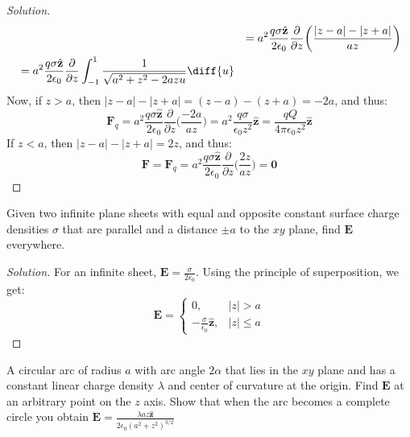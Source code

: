 \documentclass[crop=false,class=article,oneside]{standalone}
\begin{document}
\begin{proof}[Solution]
\begin{align*}
            &
            &=a^{2}\frac{q\sigma\hat{\mathbf{z}}}{2\epsilon_{0}}
            \frac{\partial}{\partial{z}}
            \bigg(\frac{|z-a|-|z+a|}{az}\bigg)\\
            &=a^{2}\frac{q\sigma \hat{\mathbf{z}}}{2\epsilon_{0}}
            \frac{\partial}{\partial{z}}
            \int_{-1}^{1}\frac{1}{\sqrt{a^{2}+z^{2}-2azu}}\diff{u}\\
        \end{align*}
        Now, if $z>a$, then $|z-a|-|z+a|=(z-a)-(z+a)=-2a$, and thus:
        \begin{equation*}
            \mathbf{F}_{q}
            =a^{2}\frac{q\sigma\hat{\mathbf{z}}}{2\epsilon_{0}}
            \frac{\partial}{\partial{z}}\bigg(\frac{-2a}{az}\bigg)
            =a^{2}\frac{q\sigma}{\epsilon_{0}z^{2}}\hat{\mathbf{z}}
            =\frac{qQ}{4\pi\epsilon_{0}z^{2}}\hat{\mathbf{z}}\tag{$z>a$}
        \end{equation*}
        If $z<a$, then $|z-a|-|z+a|=2z$, and thus:
        \begin{equation*}
            \mathbf{F}=\mathbf{F}_{q}=a^{2}\frac{q\sigma
            \hat{\mathbf{z}}}{2\epsilon_{0}}
            \frac{\partial}{\partial z}\bigg(\frac{2z}{az}\bigg)
            =\mathbf{0}\tag{$z<a$}
        \end{equation*}
    \end{proof}
    \begin{problem}[Wangsness 3-9]
        Given two infinite plane sheets with equal and opposite
        constant surface charge densities $\sigma$ that are
        parallel and a distance $\pm a$ to the $xy$ plane,
        find $\mathbf{E}$ everywhere.
    \end{problem}
    \begin{proof}[Solution]
        For an infinite sheet,
        $\mathbf{E}=\frac{\sigma}{2\epsilon_{0}}$.
        Using the principle of superposition, we get:
        \begin{equation*}
            \mathbf{E}=
            \begin{cases}
                0,
                &|z|>a\\
                -\frac{\sigma}
                      {\epsilon_{0}}\hat{\mathbf{z}},
                &|z|\leq{a}
            \end{cases}
        \end{equation*}
    \end{proof}
    \begin{problem}[Wangsness 3-10]
        A circular arc of radius $a$ with arc angle $2\alpha$
        that lies in the $xy$ plane and has a constant linear
        charge density $\lambda$ and center of curvature at
        the origin. Find $\mathbf{E}$ at an arbitrary point
        on the $z$ axis. Show that when the arc becomes a
        complete circle you obtain
        $\mathbf{E}%
         =\frac{\lambda{az}\hat{\mathbf{z}}}%
               {2\epsilon_{0}(a^{2}+z^{2})^{3/2}}$
    \end{problem}
\end{document}
